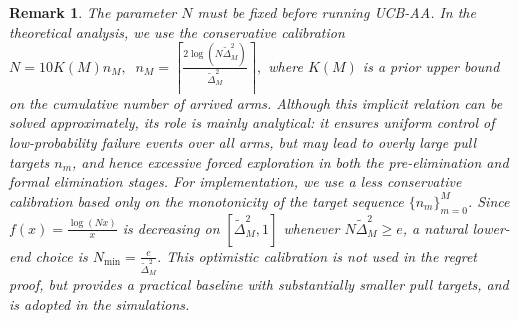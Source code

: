 \documentclass[
  12pt]{article}
\newtheorem{note}{Remark}
\begin{document}
\begin{note}


The parameter \(N\) must be fixed before running UCB-AA. In the theoretical analysis,
we use the conservative calibration
\(
N=10K(M)n_M, 
\;\;
n_M=\left\lceil 
\frac{2\log(N\widetilde\Delta_M^2)}{\widetilde\Delta_M^2}
\right\rceil ,
\)
where \(K(M)\) is a prior upper bound on the cumulative number of arrived arms. Although
this implicit relation can be solved approximately, its role is mainly analytical: it ensures
uniform control of low-probability failure events over all arms, but may lead to overly large
pull targets \(n_m\), and hence excessive forced exploration in both the pre-elimination and
formal elimination stages. For implementation, we use a less conservative calibration based only on the monotonicity
of the target sequence \(\{n_m\}_{m=0}^M\). Since
\(
f(x)=\frac{\log(Nx)}{x}
\)
is decreasing on \([\widetilde\Delta_M^2,1]\) whenever
\(N\widetilde\Delta_M^2\ge e\), a natural lower-end choice is
\(
N_{\min}=\frac{e}{\widetilde\Delta_M^2}.
\)
This optimistic calibration is not used in the regret proof, but provides a practical baseline
with substantially smaller pull targets, and is adopted in the simulations.

\end{note}
\end{document}
